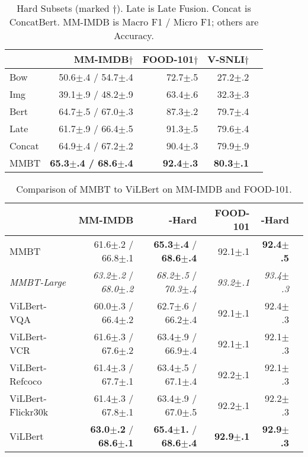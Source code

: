 \documentclass[11pt,a4paper]{article}
\begin{document}
\begin{table}[t]
\centering\small
  \begin{tabular}{lrrrr}
    \toprule
    & MM-IMDB$\dagger$ & FOOD-101$\dagger$ & V-SNLI$\dagger$ \\\midrule
  	Bow & 50.6$\pm$.4 / 54.7$\pm$.4 & 72.7$\pm$.5 & 27.2$\pm$.2\\
  	Img & 39.1$\pm$.9 / 48.2$\pm$.9 & 63.4$\pm$.6 & 32.3$\pm$.3\\
  	Bert & 64.7$\pm$.5 / 67.0$\pm$.3 & 87.3$\pm$.2 & 79.7$\pm$.4\\\midrule
  	Late & 61.7$\pm$.9 / 66.4$\pm$.5 & 91.3$\pm$.5 & 79.6$\pm$.4\\
  	Concat & 64.9$\pm$.4 / 67.2$\pm$.2 & 90.4$\pm$.3 & 79.9$\pm$.9\\
  	MMBT & \textbf{65.3$\pm$.4 / 68.6$\pm$.4} & \textbf{92.4$\pm$.3} & \textbf{80.3$\pm$.1}\\
  	\bottomrule
  \end{tabular}
    \caption{Hard Subsets (marked $\dagger$). Late is Late Fusion. Concat is ConcatBert. MM-IMDB is Macro F1 / Micro F1; others are Accuracy.}
     \label{tab:hard}
\end{table}


\begin{table*}[t]
  \centering\small
  \begin{tabular}{lrrrrr}
    \toprule
    & MM-IMDB & -Hard & FOOD-101 & -Hard\\\midrule
  	MMBT & 61.6$\pm$.2 / 66.8$\pm$.1 & \textbf{65.3$\pm$.4} / \textbf{68.6$\pm$.4} & 92.1$\pm$.1 & \textbf{92.4$\pm$.5}\\ \emph{MMBT-Large} & \emph{63.2$\pm$.2} / \emph{68.0$\pm$.2} & \emph{68.2$\pm$.5} / \emph{70.3$\pm$.4} & \emph{93.2$\pm$.1} & \emph{93.4$\pm$.3}\\\midrule
	ViLBert-VQA & 60.0$\pm$.3 / 66.4$\pm$.2 & 62.7$\pm$.6 / 66.2$\pm$.4 & 92.1$\pm$.1 & 92.4$\pm$.3\\
	ViLBert-VCR & 61.6$\pm$.3 / 67.6$\pm$.2 & 63.4$\pm$.9 / 66.9$\pm$.4 & 92.1$\pm$.1 & 92.1$\pm$.3\\
	ViLBert-Refcoco & 61.4$\pm$.3 / 67.7$\pm$.1 & 63.4$\pm$.5 / 67.1$\pm$.4 & 92.2$\pm$.1 & 92.1$\pm$.3\\
	ViLBert-Flickr30k & 61.4$\pm$.3 / 67.8$\pm$.1 & 63.4$\pm$.9 / 67.0$\pm$.5 & 92.2$\pm$.1 & 92.2$\pm$.3\\
	ViLBert & \textbf{63.0$\pm$.2} / \textbf{68.6$\pm$.1} & \textbf{65.4$\pm$1.} / \textbf{68.6$\pm$.4} & \textbf{92.9$\pm$.1} & \textbf{92.9$\pm$.3}\\
  	\bottomrule
  \end{tabular}
  \caption{Comparison of MMBT to ViLBert on MM-IMDB and FOOD-101.}
  \label{tab:vilbert}
\end{table*}
\end{document}
